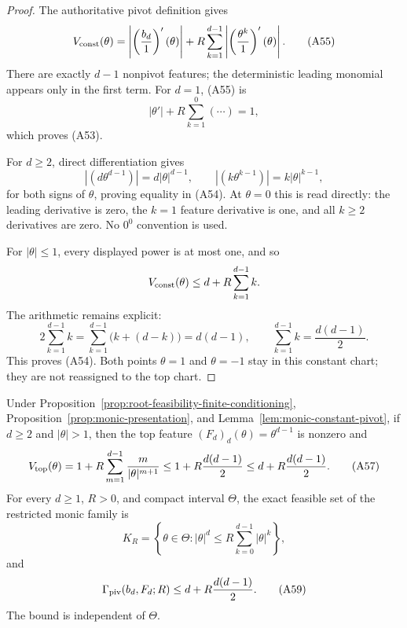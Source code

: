 \begin{proof}
The authoritative pivot definition gives
\[
V_{\rm const}(\theta)
=\left|\left(\frac{b_d}{1}\right)'(\theta)\right|
+R\sum_{k=1}^{d-1}
 \left|\left(\frac{\theta^k}{1}\right)'(\theta)\right|.
\tag{A55}
\]
There are exactly $d-1$ nonpivot features; the deterministic leading
monomial appears only in the first term.  For $d=1$, \textup{(A55)} is
\[
|\theta'|+R\sum_{k=1}^0(\cdots)=1,
\]
which proves \textup{(A53)}.

For $d\geq2$, direct differentiation gives
\[
|(d\theta^{d-1})|=d|\theta|^{d-1},
\qquad
|(k\theta^{k-1})|=k|\theta|^{k-1},
\]
for both signs of $\theta$, proving equality in \textup{(A54)}.  At
$\theta=0$ this is read directly: the leading derivative is zero, the
$k=1$ feature derivative is one, and all $k\geq2$ derivatives are zero.
No $0^0$ convention is used.

For $|\theta|\leq1$, every displayed power is at most one, and so
\[
V_{\rm const}(\theta)\leq d+R\sum_{k=1}^{d-1}k.
\]
The arithmetic remains explicit:
\[
2\sum_{k=1}^{d-1}k
=\sum_{k=1}^{d-1}\bigl(k+(d-k)\bigr)
=d(d-1),
\qquad
\sum_{k=1}^{d-1}k=\frac{d(d-1)}2.
\tag{A56}
\]
This proves \textup{(A54)}.  Both points $\theta=1$ and $\theta=-1$ stay
in this constant chart; they are not reassigned to the top chart.
\end{proof}

\begin{proposition}
\label{prop:monic-global-pivot}
Under Proposition~\ref{prop:root-feasibility-finite-conditioning},
Proposition~\ref{prop:monic-presentation}, and
Lemma~\ref{lem:monic-constant-pivot}, if $d\geq2$ and $|\theta|>1$, then
the top feature $(F_d)_d(\theta)=\theta^{d-1}$ is nonzero and
\[
V_{\rm top}(\theta)
=1+R\sum_{m=1}^{d-1}\frac{m}{|\theta|^{m+1}}
\leq1+R\frac{d(d-1)}2
\leq d+R\frac{d(d-1)}2.
\tag{A57}
\]
For every $d\geq1$, $R>0$, and compact interval $\Theta$, the exact
feasible set of the restricted monic family is
\[
K_R=\left\{\theta\in\Theta:
 |\theta|^d\leq R\sum_{k=0}^{d-1}|\theta|^k\right\},
\tag{A58}
\]
and
\[
\Gamma_{\rm piv}(b_d,F_d;R)
\leq d+R\frac{d(d-1)}2.
\tag{A59}
\]
The bound is independent of $\Theta$.
\end{proposition}


